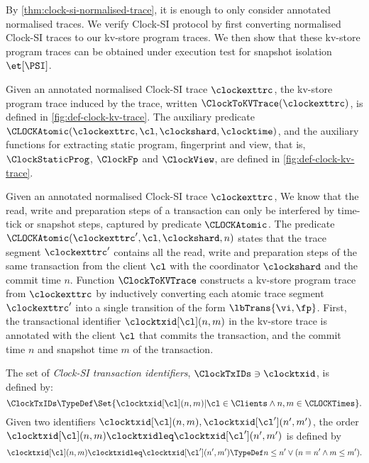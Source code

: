 By \cref{thm:clock-si-normalised-trace}, it is enough to only consider annotated normalised traces.
We verify Clock-SI protocol by first converting normalised Clock-SI traces to our kv-store program traces.
We then show that these kv-store  program traces can be obtained under execution test for snapshot isolation \( \et[\PSI] \).

\begin{definition}
Given an annotated normalised Clock-SI trace \( \clockexttrc \),
the kv-store  program trace induced by the trace, written \( \ClockToKVTrace(\clockexttrc) \),
is defined in \cref{fig:def-clock-kv-trace}.
The auxiliary predicate \( \CLOCKAtomic(\clockexttrc,\cl,\clockshard,\clocktime)\),
and the auxiliary functions for extracting static program, fingerprint and view,
that is, \( \ClockStaticProg \), \( \ClockFp\) and \( \ClockView\), are defined in \cref{fig:def-clock-kv-trace}.
\end{definition}



Given an annotated normalised  Clock-SI trace \( \clockexttrc \),
We know that the read, write and preparation steps of a transaction 
can only be interfered by time-tick or snapshot steps, captured by predicate \( \CLOCKAtomic \).
The predicate \( \CLOCKAtomic(\clockexttrc',\cl,\clockshard,n) \)  states that 
the trace segment \( \clockexttrc' \) contains all the read, write and preparation steps
of the same transaction from the client \( \cl \) 
with the coordinator \( \clockshard \) and the commit time \( n\).
Function \( \ClockToKVTrace \) constructs a kv-store program trace from \( \clockexttrc \) by inductively converting
each atomic trace segment \( \clockexttrc' \) 
into a single transition of the form \(\lbTrans{\vi,\fp} \).
First, the transactional identifier \( \clocktxid[\cl](n,m) \) in the kv-store trace is annotated 
with the client \( \cl \) that commits the transaction, and 
the commit time \( n \) and snapshot time  \( m \) of the transaction.

\begin{definition}
The set of \emph{Clock-SI transaction identifiers}, \( \ClockTxIDs \ni \clocktxid \),
is defined by:
\[
    \ClockTxIDs \TypeDef \Set{\clocktxid[\cl](n,m) | \cl \in \Clients \land n,m \in \CLOCKTimes} .
\]
Given two identifiers \( \clocktxid[\cl](n,m), \clocktxid[\cl'](n',m') \),
the order \( \clocktxid[\cl](n,m) \clocktxidleq \clocktxid[\cl'](n',m') \) is defined by
\[
    \clocktxid[\cl](n,m) \clocktxidleq \clocktxid[\cl'](n',m') \TypeDef
    n \leq n' \lor (n = n' \land m \leq m') .
\]
\end{definition}

